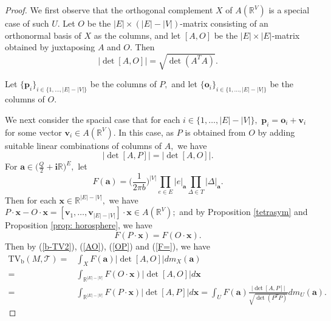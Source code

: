 \documentclass[11pt]{article}
\theoremstyle{remark}
\theoremstyle{remark}
\numberwithin{equation}{section}
\begin{document}
\begin{proof} 
We first observe that the orthogonal complement $X$ of $A(\mathbb R^V)$ is a special case of such $U.$ Let $O$ be the $|E|\times(|E|-|V|)$-matrix consisting of an orthonormal basis of $X$ as the columns, and let $[A,O]$ be the $|E|\times |E|$-matrix obtained by juxtaposing $A$ and $O.$ Then 
\begin{equation}\label{AO}
\big|\det[A,O]\big|=\sqrt{\det (A^TA)}.   
\end{equation}


Let $\{\boldsymbol p_i\}_{i\in \{1,\dots, |E|-|V|\}}$ be the columns of $P,$ and let $\{\boldsymbol o_i\}_{i\in \{1,\dots, |E|-|V|\}}$ be the columns of $O.$ 

We next consider the spacial case that for each $i\in \{1,\dots, |E|-|V|\},$ $\boldsymbol p_i=\boldsymbol o_i + \boldsymbol v_i$
for some vector $\boldsymbol v_i \in A(\mathbb R^V).$ In this case, as $P$ is obtained from $O$ by adding suitable linear combinations of columns of $A,$ we have 
\begin{equation}\label{OP}
\big|\det[A,P]\big|=\big|\det[A,O]\big|.
\end{equation}
For $\boldsymbol a\in \big(\frac{Q}{2}+\mathbf i\mathbb R\big)^E,$ let 
$$F(\boldsymbol a)= \bigg(\frac{1}{2\pi b}\bigg)^{|V|} \prod_{e\in E}|e|_{\boldsymbol a}\prod_{\Delta\in T} |\Delta|_{\boldsymbol a}.$$
Then for each $\boldsymbol x\in \mathbb R^{|E|-|V|},$ we have 
$P\cdot \boldsymbol x - O \cdot \boldsymbol x =[\boldsymbol v_1,\dots,\boldsymbol v_{|E|-|V|}]\cdot \boldsymbol x \in A(\mathbb R^V);$
and by Proposition \ref{tetrasym} and Proposition \ref{prop: horosphere}, we have 
\begin{equation}\label{F=}
    F(P\cdot \boldsymbol x)=F(O\cdot \boldsymbol x).
\end{equation}
Then by (\ref{b-TV2}), (\ref{AO}), (\ref{OP}) and (\ref{F=}), we have
\begin{equation}\label{sP}
 \begin{split}
   \mathrm{TV_b}(M,\mathcal T)= & \int _ X  F(\boldsymbol a)\big|\det[A,O]\big|dm_X(\boldsymbol a)\\
   = & \int _ {\mathbb R^{|E|-|V|}} F(O\cdot \boldsymbol x)\big|\det[A,O]\big|d\boldsymbol x\\
    = & \int _ {\mathbb R^{|E|-|V|}} F(P\cdot \boldsymbol x)\big|\det[A,P]\big|d\boldsymbol x
 = \int_U F( \boldsymbol a)\frac{\big|\det[A,P]\big|}{\sqrt{\det(P^TP)}}dm_U(\boldsymbol a).
 \end{split}   
\end{equation}


\end{proof}
\end{document}
